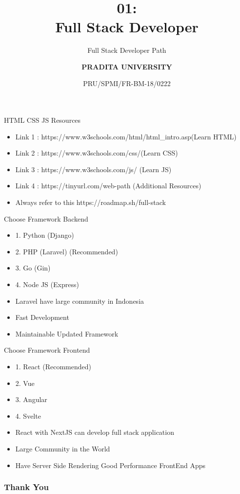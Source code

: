 \documentclass[aspectratio=169, table]{beamer}
\subtitle{Full Stack Developer Path}
\title{\Huge {\textbf{01: \\Full Stack Developer}}}
\date[Serial]{\scriptsize {PRU/SPMI/FR-BM-18/0222}}
\author[Pradita]{\small {\textbf{PRADITA UNIVERSITY}}}
\begin{document}
\begin{frame}
    \titlepage
\end{frame}

\begin{frame}{HTML CSS JS Resources}
    \vskip-1cm
    \begin{itemize}
        \item Link 1 : https://www.w3schools.com/html/html\_intro.asp(Learn HTML)
        \item Link 2 : https://www.w3schools.com/css/(Learn CSS)
        \item Link 3 : https://www.w3schools.com/js/ (Learn JS)
        \item Link 4 : https://tinyurl.com/web-path (Additional Resources)
        \item Always refer to this https://roadmap.sh/full-stack
    \end{itemize}
\end{frame}

\begin{frame}{Choose Framework Backend}
    \vskip-1cm
    \begin{itemize}
        \item 1. Python (Django)
        \item 2. PHP (Laravel) (Recommended)
        \item 3. Go (Gin)
        \item 4. Node JS (Express)
        \item Laravel have large community in Indonesia
        \item Fast Development
        \item Maintainable Updated Framework
    \end{itemize}
\end{frame}

\begin{frame}{Choose Framework Frontend}
    \vskip-1cm
    \begin{itemize}
        \item 1. React (Recommended)
        \item 2. Vue
        \item 3. Angular
        \item 4. Svelte
        \item React with NextJS can develop full stack application
        \item Large Community in the World
       \item Have Server Side Rendering Good Performance FrontEnd Apps
    \end{itemize}
\end{frame}

\begin{frame4}
    \frametitle{Thank You}
\end{frame4}
\end{document}
